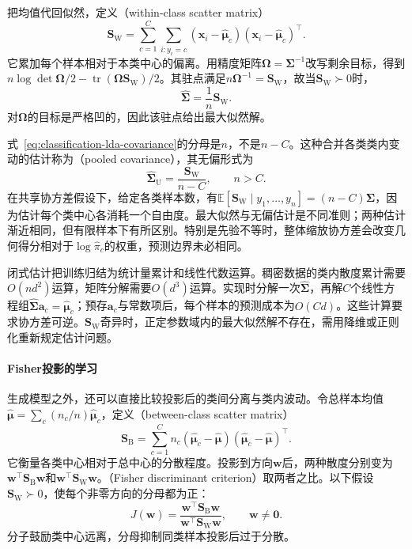 把均值代回似然，定义（within-class scatter matrix）
\begin{equation}
  \label{eq:classification-lda-within}
  \bm{S}_{\mathrm{W}}
    =\sum_{c=1}^{C}\sum_{i:y_i=c}
      (\bm{x}_i-\hat{\bm{\mu}}_c)
      (\bm{x}_i-\hat{\bm{\mu}}_c)^{\top}.
\end{equation}
它累加每个样本相对于本类中心的偏离。用精度矩阵$\bm{\Omega}=\bm{\Sigma}^{-1}$改写剩余目标，得到$n\log\det\bm{\Omega}/2-\operatorname{tr}(\bm{\Omega}\bm{S}_{\mathrm{W}})/2$。其驻点满足$n\bm{\Omega}^{-1}=\bm{S}_{\mathrm{W}}$，故当$\bm{S}_{\mathrm{W}}\succ0$时，
\begin{equation}
  \label{eq:classification-lda-covariance}
  \hat{\bm{\Sigma}}=\frac1n\bm{S}_{\mathrm{W}} .
\end{equation}
对$\bm{\Omega}$的目标是严格凹的，因此该驻点给出最大似然解。

式~\eqref{eq:classification-lda-covariance}的分母是$n$，不是$n-C$。这种合并各类类内变动的估计称为（pooled covariance），其无偏形式为
\[
  \hat{\bm{\Sigma}}_{\mathrm{U}}
    =\frac{\bm{S}_{\mathrm{W}}}{n-C},\qquad n>C .
\]
在共享协方差假设下，给定各类样本数，有$\mathbb{E}[\bm{S}_{\mathrm{W}}\mid y_1,\ldots,y_n]=(n-C)\bm{\Sigma}$，因为估计每个类中心各消耗一个自由度。最大似然与无偏估计是不同准则；两种估计渐近相同，但有限样本下有所区别。特别是先验不等时，整体缩放协方差会改变几何得分相对于$\log\hat\pi_c$的权重，预测边界未必相同。

闭式估计把训练归结为统计量累计和线性代数运算。稠密数据的类内散度累计需要$O(nd^2)$运算，矩阵分解需要$O(d^3)$运算。实现时分解一次$\hat{\bm{\Sigma}}$，再解$C$个线性方程组$\hat{\bm{\Sigma}}\bm{a}_c=\hat{\bm{\mu}}_c$；预存$\bm{a}_c$与常数项后，每个样本的预测成本为$O(Cd)$。这些计算要求协方差可逆。$\bm{S}_{\mathrm{W}}$奇异时，正定参数域内的最大似然解不存在，需用降维或正则化重新规定估计问题。

\paragraph{Fisher投影的学习}
生成模型之外，还可以直接比较投影后的类间分离与类内波动。令总样本均值$\hat{\bm{\mu}}=\sum_c(n_c/n)\hat{\bm{\mu}}_c$，定义（between-class scatter matrix）
\[
  \bm{S}_{\mathrm{B}}
    =\sum_{c=1}^{C}n_c
      (\hat{\bm{\mu}}_c-\hat{\bm{\mu}})
      (\hat{\bm{\mu}}_c-\hat{\bm{\mu}})^{\top}.
\]
它衡量各类中心相对于总中心的分散程度。投影到方向$\bm{w}$后，两种散度分别变为$\bm{w}^{\top}\bm{S}_{\mathrm{B}}\bm{w}$和$\bm{w}^{\top}\bm{S}_{\mathrm{W}}\bm{w}$。（Fisher discriminant criterion）取两者之比。以下假设$\bm{S}_{\mathrm{W}}\succ0$，使每个非零方向的分母都为正：
\begin{equation}
  \label{eq:classification-fisher-criterion}
  J(\bm{w})
    =\frac{\bm{w}^{\top}\bm{S}_{\mathrm{B}}\bm{w}}
      {\bm{w}^{\top}\bm{S}_{\mathrm{W}}\bm{w}},
    \qquad \bm{w}\ne\bm{0}.
\end{equation}
分子鼓励类中心远离，分母抑制同类样本投影后过于分散。

